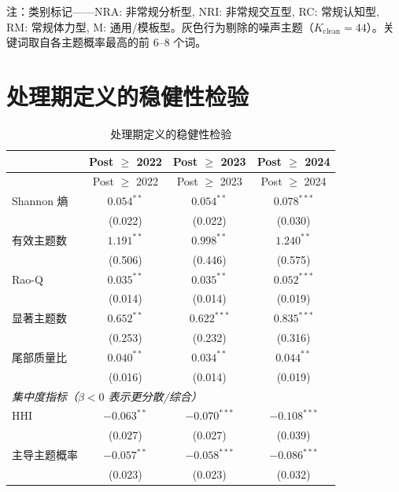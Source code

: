 \documentclass[12pt, a4paper]{article}
\begin{document}
\noindent 注：类别标记——NRA: 非常规分析型, NRI: 非常规交互型, RC: 常规认知型, RM: 常规体力型, M: 通用/模板型。灰色行为剔除的噪声主题（$K_{\text{clean}} = 44$）。关键词取自各主题概率最高的前 6--8 个词。

\section{处理期定义的稳健性检验}

\begin{longtable}{lccc}
\caption{处理期定义的稳健性检验}\label{tab:app_post_timing} \\
\toprule
& Post $\geq$ 2022 & Post $\geq$ 2023 & Post $\geq$ 2024 \\
\midrule
\endfirsthead
\toprule
& Post $\geq$ 2022 & Post $\geq$ 2023 & Post $\geq$ 2024 \\
\midrule
\endhead
\bottomrule
\endfoot
Shannon 熵
  & $0.054^{**}$   & $0.054^{**}$   & $0.078^{***}$  \\
  & (0.022)        & (0.022)        & (0.030)        \\[4pt]
有效主题数
  & $1.191^{**}$   & $0.998^{**}$   & $1.240^{**}$   \\
  & (0.506)        & (0.446)        & (0.575)        \\[4pt]
Rao-Q
  & $0.035^{**}$   & $0.035^{**}$   & $0.052^{***}$  \\
  & (0.014)        & (0.014)        & (0.019)        \\[4pt]
显著主题数
  & $0.652^{**}$   & $0.622^{***}$  & $0.835^{***}$  \\
  & (0.253)        & (0.232)        & (0.316)        \\[4pt]
尾部质量比
  & $0.040^{**}$   & $0.034^{**}$   & $0.044^{**}$   \\
  & (0.016)        & (0.014)        & (0.019)        \\[4pt]
\midrule
\multicolumn{4}{l}{\textit{集中度指标（$\beta < 0$ 表示更分散/综合）}} \\[2pt]
HHI
  & $-0.063^{**}$  & $-0.070^{***}$ & $-0.108^{***}$ \\
  & (0.027)        & (0.027)        & (0.039)        \\[4pt]
主导主题概率
  & $-0.057^{**}$  & $-0.058^{***}$ & $-0.086^{***}$ \\
  & (0.023)        & (0.023)        & (0.032)        \\[4pt]

\end{longtable}
\end{document}
